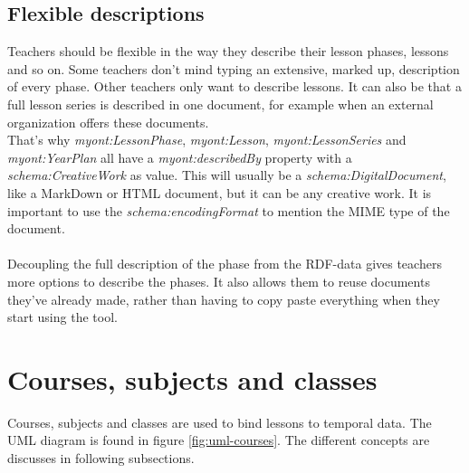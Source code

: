 \documentclass[a4paper]{report}
\begin{document}
    \subsection{Flexible descriptions}
    \label{subsubsection:descriptions}
    Teachers should be flexible in the way they describe their lesson phases, lessons and so on. Some teachers don't mind typing an extensive, marked up, description of every phase. Other teachers only want to describe lessons.
    It can also be that a full lesson series is described in one document, for example when an external organization offers these documents.\\
    That's why \emph{myont:LessonPhase}, \emph{myont:Lesson}, \emph{myont:LessonSeries} and \emph{myont:YearPlan} all have a \emph{myont:describedBy} property with a \emph{schema:CreativeWork} as value.
    This will usually be a \emph{schema:DigitalDocument}, like a MarkDown or HTML document, but it can be any creative work. It is important to use the \emph{schema:encodingFormat} to mention the MIME type of the document.\\ \\
    Decoupling the full description of the phase from the RDF-data gives teachers more options to describe the phases. It also allows them to reuse documents they've already made, rather than having to copy paste everything when they start using the tool.

    \section{Courses, subjects and classes}
    \label{subsection:courses}
    Courses, subjects and classes are used to bind lessons to temporal data. The UML diagram is found in figure \ref{fig:uml-courses}. The different concepts are discusses in following subsections.\\
\end{document}
